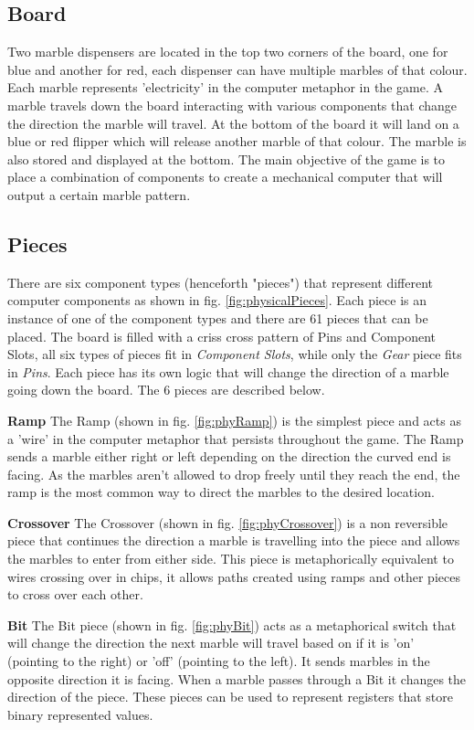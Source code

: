 \documentclass{l4proj}
\begin{document}
\subsection{Board}
Two marble dispensers are located in the top two corners of the board, one for blue and another for red, each dispenser can have multiple marbles of that colour. Each marble represents 'electricity' in the computer metaphor in the game. A marble travels down the board interacting with various components that change the direction the marble will travel. At the bottom of the board it will land on a blue or red flipper which will release another marble of that colour. The marble is also stored and displayed at the bottom. The main objective of the game is to place a combination of components to create a mechanical computer that will output a certain marble pattern.



\subsection{Pieces}
\label{section:background-pieces}
There are six component types (henceforth "pieces") that represent different computer components as shown in fig. \ref{fig:physicalPieces}. Each piece is an instance of one of the component types and there are 61 pieces that can be placed. The board is filled with a criss cross pattern of Pins and Component Slots, all six types of pieces fit in \emph{Component Slots}, while only the \emph{Gear} piece fits in \emph{Pins}. Each piece has its own logic that will change the direction of a marble going down the board. The 6 pieces are described below.

\textbf{Ramp}
The Ramp (shown in fig. \ref{fig:phyRamp}) is the simplest piece and acts as a 'wire' in the computer metaphor that persists throughout the game. The Ramp sends a marble either right or left depending on the direction the curved end is facing. As the marbles aren't allowed to drop freely until they reach the end, the ramp is the most common way to direct the marbles to the desired location.

\textbf{Crossover}
The Crossover (shown in fig. \ref{fig:phyCrossover}) is a non reversible piece that continues the direction a marble is travelling into the piece and allows the marbles to enter from either side. This piece is metaphorically equivalent to wires crossing over in chips, it allows paths created using ramps and other pieces to cross over each other.

\textbf{Bit}
The Bit piece (shown in fig. \ref{fig:phyBit}) acts as a metaphorical switch that will change the direction the next marble will travel based on if it is 'on' (pointing to the right) or 'off' (pointing to the left). It sends marbles in the opposite direction it is facing. When a marble passes through a Bit it changes the direction of the piece. These pieces can be used to represent registers that store binary represented values.
\end{document}

